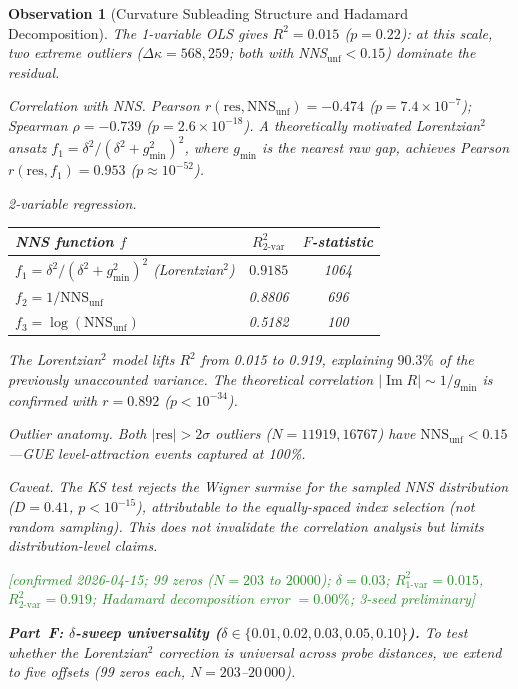 \documentclass[11pt, a4paper]{article}
\theoremstyle{definition}
\theoremstyle{plain}
\newtheorem{observation}[theorem]{Observation}
\begin{document}
\begin{observation}[Curvature Subleading Structure and Hadamard Decomposition]
The 1-variable OLS gives $R^2 = 0.015$ ($p = 0.22$): at this scale, two
extreme outliers ($\Delta\kappa = 568, 259$; both with NNS${}_\mathrm{unf}
< 0.15$) dominate the residual.

\emph{Correlation with NNS.}\;
Pearson $r(\mathrm{res},\mathrm{NNS}_\mathrm{unf}) = -0.474$
($p = 7.4 \times 10^{-7}$); Spearman $\rho = -0.739$
($p = 2.6 \times 10^{-18}$).  A theoretically motivated
Lorentzian$^2$ ansatz $f_1 = \delta^2/(\delta^2 + g_{\min}^2)^2$,
where $g_{\min}$ is the nearest raw gap, achieves
Pearson $r(\mathrm{res}, f_1) = 0.953$ ($p \approx 10^{-52}$).

\emph{2-variable regression.}\;
\begin{center}
\small
\begin{tabular}{@{} l c c @{}}
\toprule
NNS function $f$ & $R^2_{\text{2-var}}$ & $F$-statistic \\
\midrule
$f_1 = \delta^2/(\delta^2 + g_{\min}^2)^2$ (Lorentzian$^2$)
  & $\mathbf{0.9185}$ & 1064 \\
$f_2 = 1/\text{NNS}_\mathrm{unf}$ & 0.8806 & 696 \\
$f_3 = \log(\text{NNS}_\mathrm{unf})$ & 0.5182 & 100 \\
\bottomrule
\end{tabular}
\end{center}
The Lorentzian$^2$ model lifts $R^2$ from 0.015 to 0.919, explaining
$90.3\%$ of the previously unaccounted variance.  The theoretical
correlation $|\operatorname{Im} R| \sim 1/g_{\min}$ is confirmed
with $r = 0.892$ ($p < 10^{-34}$).

\emph{Outlier anatomy.}\; Both $|{\mathrm{res}}| > 2\sigma$
outliers ($N = 11919, 16767$) have
$\text{NNS}_\mathrm{unf} < 0.15$---GUE level-attraction events
captured at 100\%.

\emph{Caveat.}\; The KS test rejects the Wigner surmise for
the sampled NNS distribution ($D = 0.41$, $p < 10^{-15}$),
attributable to the equally-spaced index selection
(not random sampling).  This does not invalidate the
correlation analysis but limits distribution-level claims.

\textcolor{ForestGreen}{[confirmed 2026-04-15; 99 zeros ($N{=}203$ to $20000$);
$\delta{=}0.03$; $R^2_\text{1-var}{=}0.015$, $R^2_\text{2-var}{=}0.919$;
Hadamard decomposition error ${=}0.00\%$;
3-seed preliminary]}

\smallskip\noindent
\textbf{Part~F: $\delta$-sweep universality ($\delta \in \{0.01, 0.02, 0.03, 0.05, 0.10\}$).}\;
To test whether the Lorentzian$^2$ correction is universal across probe
distances, we extend to five offsets (99 zeros each, $N = 203$--$20\,000$).


\end{observation}
\end{document}

